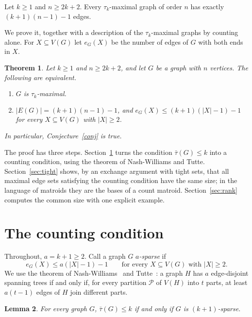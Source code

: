 \documentclass[11pt]{amsart}
\newtheorem{theorem}{Theorem}[section]
\newtheorem{lemma}[theorem]{Lemma}
\theoremstyle{definition}
\newenvironment{conjecture}[1]{\renewcommand{\theinnerconj}{#1}\innerconj}{\endinnerconj}
\theoremstyle{remark}
\numberwithin{equation}{section}
\newcommand{\tb}{\bar\tau}
\begin{document}
\begin{conjecture}{1}\label{conj}
Let $k\ge1$ and $n\ge 2k+2$. Every $\tau_k$-maximal graph of order $n$ has exactly $(k+1)(n-1)-1$ edges.
\end{conjecture}

We prove it, together with a description of the $\tau_k$-maximal graphs by counting alone. For $X\subseteq V(G)$ let $e_G(X)$ be the number of edges of $G$ with both ends in $X$.

\begin{theorem}\label{thm:main}
Let $k\ge1$ and $n\ge2k+2$, and let $G$ be a graph with $n$ vertices. The following are equivalent.
\begin{enumerate}
\item[(a)] $G$ is $\tau_k$-maximal.
\item[(b)] $|E(G)|=(k+1)(n-1)-1$, and $e_G(X)\le (k+1)(|X|-1)-1$ for every $X\subseteq V(G)$ with $|X|\ge2$.
\end{enumerate}
In particular, Conjecture~\ref{conj} is true.
\end{theorem}

The proof has three steps. Section~\ref{sec:sparse} turns the condition $\tb(G)\le k$ into a counting condition, using the theorem of Nash-Williams and Tutte. Section~\ref{sec:tight} shows, by an exchange argument with tight sets, that all maximal edge sets satisfying the counting condition have the same size; in the language of matroids they are the bases of a count matroid. Section~\ref{sec:rank} computes the common size with one explicit example.

\section{The counting condition}\label{sec:sparse}

Throughout, $a=k+1\ge 2$. Call a graph $G$ \emph{$a$-sparse} if
\begin{equation}\label{eq:sparse}
e_G(X)\le a(|X|-1)-1\qquad\text{for every }X\subseteq V(G)\text{ with }|X|\ge2 .
\end{equation}
We use the theorem of Nash-Williams~\cite{NW} and Tutte~\cite{Tutte}: a graph $H$ has $a$ edge-disjoint spanning trees if and only if, for every partition $\mathcal P$ of $V(H)$ into $t$ parts, at least $a(t-1)$ edges of $H$ join different parts.

\begin{lemma}\label{lem:sparse}
For every graph $G$, $\tb(G)\le k$ if and only if $G$ is $(k+1)$-sparse.
\end{lemma}
\end{document}
